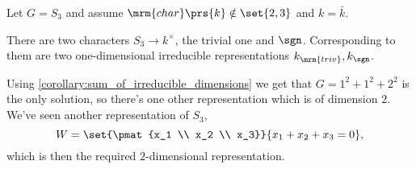\documentclass[10pt,a4paper,twoside,openany,hidelinks]{book}
\begin{document}
\begin{example}
Let $G = S_3$ and assume $\mrm{char}\prs{k} \notin \set{2,3}$ and $k = \bar{k}$.

There are two characters $S_3 \to k^\times$, the trivial one and $\sgn$.
Corresponding to them are two one-dimensional irreducible representations $k_{\mrm{triv}}, k_{\sgn}$.

Using \ref{corollary:sum_of_irreducible_dimensions} we get that
$G = 1^2 + 1^2 + 2^2$
is the only solution, so there's one other representation which is of dimension $2$.
We've seen another representation of $S_3$,
\[W = \set{\pmat{x_1 \\ x_2 \\ x_3}}{x_1 + x_2 + x_3 = 0} \text{,}\]
which is then the required $2$-dimensional representation.
\end{example}

\begin{comment}
\begin{thebibliography}{2}
\bibitem{context} 
Emily Riehl. 
\textit{Category Theory in Context}. 

\bibitem{nlab}
\textit{nLab - Online Wiki with Focus on Category Theory and Homotopy Theory}.\\
\href{https://ncatlab.org/nlab/show/HomePage}{https://ncatlab.org/nlab/show/HomePage}
\end{thebibliography}
\end{comment}

\backmatter
\end{document}
